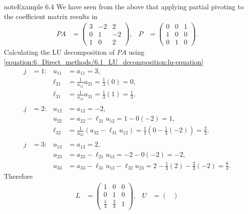 \documentclass[letterpaper,10pt,english]{jupyterBook}
\begin{document}
\begin{sphinxadmonition}{note}{Example 6.4}
\sphinxAtStartPar
We have seen from the {\hyperref[\detokenize{6_Direct_methods/6.2_LUP_decomposition:pivoting-example}]{}} above that applying partial pivoting to the coefficient matrix results in
\begin{align*}
    PA &= \begin{pmatrix}
        3 & -2 & 2\\
        0 & 1 & -2\\
        1 & 0 & 2
    \end{pmatrix}, &
    P &= \begin{pmatrix}
        0 & 0 & 1\\
        1 & 0 & 0\\
        0 & 1 & 0
    \end{pmatrix}.
\end{align*}
\sphinxAtStartPar
Calculating the LU decomposition of \(PA\) using \eqref{equation:6_Direct_methods/6.1_LU_decomposition:lu-equation}
\begin{align*}
    j &= 1: & u_{11} &=a_{11} =3, \\
    & & \ell_{21} &= \frac{1}{u_{11} }a_{21} = \frac{1}{3}(0)=0, \\
    & & \ell_{31} &= \frac{1}{u_{11} }a_{31} = \frac{1}{3}(1)=\frac{1}{3}, \\
    \\
    j &= 2: & u_{12} &= a_{12} =-2, \\
    & & u_{22} &= a_{22} - \ell_{21} u_{12} = 1 - 0(-2) = 1, \\
    & & \ell_{32} &= \frac{1}{u_{22}}(a_{32} -\ell_{31} u_{12}) = \frac{1}{1} \left( 0 - \frac{1}{3}(-2) \right) = \frac{2}{3}, \\
    \\
    j &= 3: & u_{13} &= a_{13} = 2, \\
    & & u_{23} &= a_{23} -\ell_{21} u_{13} = -2 - 0(-2) = -2, \\
    & & u_{33} &= a_{33} -\ell_{31} u_{13} -\ell_{32} u_{23} = 2 - \frac{1}{3}(2)- \frac{2}{3}(-2) = \frac{8}{3}.
\end{align*}
\sphinxAtStartPar
Therefore
\begin{align*}
    L &= \begin{pmatrix}
        1 & 0 & 0\\
        0 & 1 & 0\\
        \frac{1}{3} & \frac{2}{3} & 1
    \end{pmatrix}, &
    U &= \begin{pmatrix}

\end{pmatrix}
\end{align*}
\end{sphinxadmonition}
\end{document}
